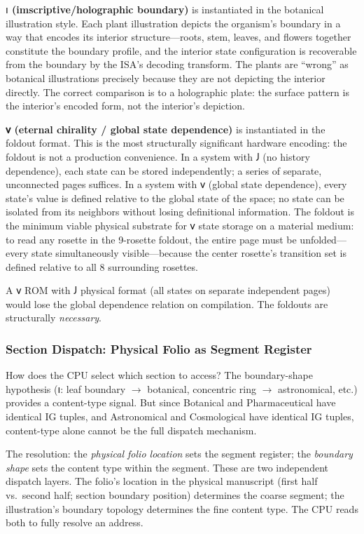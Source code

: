 \documentclass[12pt,a4paper]{article}
\begin{document}
\textbf{$𐑦$ (imscriptive/holographic boundary)} is instantiated in the botanical illustration style. Each plant illustration depicts the organism's boundary in a way that encodes its interior structure---roots, stem, leaves, and flowers together constitute the boundary profile, and the interior state configuration is recoverable from the boundary by the ISA's decoding transform. The plants are ``wrong'' as botanical illustrations precisely because they are not depicting the interior directly. The correct comparison is to a holographic plate: the surface pattern is the interior's encoded form, not the interior's depiction.

\textbf{𐑫 (eternal chirality / global state dependence)} is instantiated in the foldout format. This is the most structurally significant hardware encoding: the foldout is not a production convenience. In a system with $𐑓$ (no history dependence), each state can be stored independently; a series of separate, unconnected pages suffices. In a system with 𐑫 (global state dependence), every state's value is defined relative to the global state of the space; no state can be isolated from its neighbors without losing definitional information. The foldout is the minimum viable physical substrate for 𐑫 state storage on a material medium: to read any rosette in the 9-rosette foldout, the entire page must be unfolded---every state simultaneously visible---because the center rosette's transition set is defined relative to all 8 surrounding rosettes.

A 𐑫 ROM with $𐑓$ physical format (all states on separate independent pages) would lose the global dependence relation on compilation. The foldouts are structurally \emph{necessary}.

\subsubsection{Section Dispatch: Physical Folio as Segment Register}

How does the CPU select which section to access? The boundary-shape hypothesis ($𐑦$: leaf boundary $\to$ botanical, concentric ring $\to$ astronomical, etc.) provides a content-type signal. But since Botanical and Pharmaceutical have identical IG tuples, and Astronomical and Cosmological have identical IG tuples, content-type alone cannot be the full dispatch mechanism.

The resolution: the \emph{physical folio location} sets the segment register; the \emph{boundary shape} sets the content type within the segment. These are two independent dispatch layers. The folio's location in the physical manuscript (first half vs.\ second half; section boundary position) determines the coarse segment; the illustration's boundary topology determines the fine content type. The CPU reads both to fully resolve an address.
\end{document}
